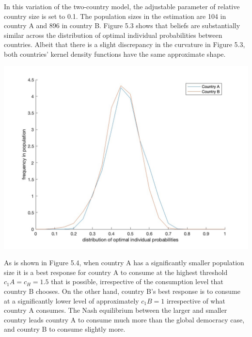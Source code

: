 \documentclass[11pt,preprint, authoryear]{elsarticle}
\let\origfigure\figure
\let\endorigfigure\endfigure
\renewenvironment{figure}[1][2] {
    \expandafter\origfigure\expandafter[H]
} {
    \endorigfigure
}
\numberwithin{equation}{section}
\numberwithin{figure}{section}
\numberwithin{table}{section}
\begin{document}
In this variation of the two-country model, the adjustable parameter of
relative country size is set to 0.1. The population sizes in the
estimation are 104 in country A and 896 in country B. Figure 5.3 shows
that beliefs are substantially similar across the distribution of
optimal individual probabilities between countries. Albeit that there is
a slight discrepancy in the curvature in Figure 5.3, both countries'
kernel density functions have the same approximate shape.

\begin{figure}[H]

{\centering \includegraphics[width=0.8\linewidth]{images/Fig4_0.1Size0Bias} 

}

\caption{Asymmetric country size model: Kernel density function of the distribution of the optimal probabilty of crisis and frequency thereof across individuals in country A and country B}\label{fig:Fig 5.3}
\end{figure}

As is shown in Figure 5.4, when country A has a significantly smaller
population size it is a best response for country A to consume at the
highest threshold \(c_1A=c_H=1.5\) that is possible, irrespective of the
consumption level that country B chooses. On the other hand, country B's
best response is to consume at a significantly lower level of
approximately \(c_1B=1\) irrespective of what country A consumes. The
Nash equilibrium between the larger and smaller country leads country A
to consume much more than the global democracy case, and country B to
consume slightly more.
\end{document}
